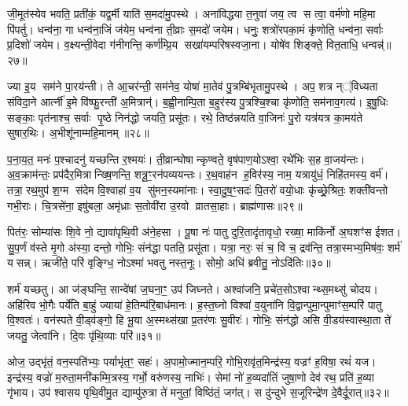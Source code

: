{\anuvakamend[{अ॒गा॒ स॒ह॒स्रा॒क्ष॒ दे॒वा॒स्स॒हस्र॑धारा॒मत्यꣳ॑हा॒ अनु॑वर्त्मानः॒ षोड॑श च॥५॥}]}

जी॒मूत॑स्येव भवति॒ प्रती॑कं॒ यद्व॒र्मी याति॑ स॒मदा॑मु॒पस्थे। अना॑विद्धया त॒नुवा॑ जय॒ त्व स त्वा॒ वर्म॑णो महि॒मा पि॑पर्तु। धन्व॑ना॒ गा धन्व॑ना॒जिं ज॑येम॒ धन्व॑ना ती॒व्राः स॒मदो॑ जयेम। धनुः॒ शत्रो॑रपका॒मं कृ॑णोति॒ धन्व॑ना॒ सर्वाः प्र॒दिशो॑ जयेम। व॒क्ष्यन्ती॒वेदा ग॑नीगन्ति॒ कर्ण॑म्प्रि॒य सखा॑यम्परिषस्वजा॒ना। योषे॑व शिङ्क्ते॒ वित॒ताधि॒ धन्वन्न्॑॥२७॥

ज्या इ॒य सम॑ने पा॒रय॑न्ती। ते आ॒चर॑न्ती॒ सम॑नेव॒ योषा॑ मा॒तेव॑ पु॒त्रम्बि॑भृतामु॒पस्थे। अप॒ शत्र न््॑विध्यता संविदा॒ने आर्त्नी॑ इ॒मे वि॑ष्फु॒रन्ती॑ अ॒मित्रान्॑। ब॒ह्वी॒नाम्पि॒ता ब॒हुर॑स्य पु॒त्रश्चि॒श्चा कृ॑णोति॒ सम॑नाव॒गत्य॑। इ॒षु॒धिः सङ्काः॒ पृत॑नाश्च॒ सर्वाः पृ॒ष्ठे निन॑द्धो जयति॒ प्रसू॑तः। रथे॒ तिष्ठ॑न्नयति वा॒जिनः॑ पु॒रो यत्र॑यत्र का॒मय॑ते सुषार॒थिः। अ॒भीशू॑नाम्महि॒मानम्॥२८॥

प॒ना॒य॒त॒ मनः॑ प॒श्चादनु॑ यच्छन्ति र॒श्मयः॑। ती॒व्रान्घोषान्कृण्वते॒ वृष॑पाण॒योऽश्वा॒ रथे॑भिः स॒ह वा॒जय॑न्तः। अ॒व॒क्राम॑न्तः॒ प्रप॑दैर॒मित्रान्ख्षि॒णन्ति॒ शत्रू॒ꣳ॒रन॑पव्ययन्तः। र॒थ॒वाह॑न ह॒विर॑स्य॒ नाम॒ यत्रायु॑धं॒ निहि॑तमस्य॒ वर्म॑। तत्रा॒ रथ॒मुप॑ श॒ग्म स॑देम वि॒श्वाहा॑ व॒य सु॑मन॒स्यमा॑नाः। स्वा॒दु॒ष॒ꣳ॒सदः॑ पि॒तरो॑ वयो॒धाः कृ॑च्छ्रे॒श्रितः॒ शक्ती॑वन्तो गभी॒राः। चि॒त्रसे॑ना॒ इषु॑बला॒ अमृ॑ध्राः स॒तोवी॑रा उ॒रवो व्रातसा॒हाः। ब्राह्म॑णासः॥२९॥

पित॑रः॒ सोम्या॑सः शि॒वे नो॒ द्यावा॑पृथि॒वी अ॑ने॒हसा। पू॒षा नः॑ पातु दुरि॒तादृ॑तावृधो॒ रख्षा॒ माकि॑र्नो अ॒घशꣳ॑स ईशत। सु॒प॒र्णं व॑स्ते मृ॒गो अ॑स्या॒ दन्तो॒ गोभिः॒ संन॑द्धा पतति॒ प्रसू॑ता। यत्रा॒ नरः॒ सं च॒ वि च॒ द्रव॑न्ति॒ तत्रा॒स्मभ्य॒मिष॑वः॒ शर्म॑ यसन्न्। ऋजी॑ते॒ परि॑ वृङ्ग्धि॒ नोऽश्मा॑ भवतु नस्त॒नूः। सोमो॒ अधि॑ ब्रवीतु॒ नोऽदि॑तिः॥३०॥

शर्म॑ यच्छतु। आ ज॑ङ्घन्ति॒ सान्वे॑षां ज॒घना॒ꣳ॒ उप॑ जिघ्नते। अश्वा॑जनि॒ प्रचे॑त॒सोऽश्वान्थ्स॒मथ्सु॑ चोदय। अहि॑रिव भो॒गैः पर्ये॑ति बा॒हुं ज्याया॑ हे॒तिम्प॑रि॒बाध॑मानः। ह॒स्त॒घ्नो विश्वा॑ व॒युना॑नि वि॒द्वान्पुमा॒न्पुमाꣳ॑स॒म्परि॑ पातु वि॒श्वतः॑। वन॑स्पते वी॒ड्व॑ङ्गो॒ हि भू॒या अ॒स्मथ्स॑खा प्र॒तर॑णः सु॒वीरः॑। गोभिः॒ संन॑द्धो असि वी॒डय॑स्वास्था॒ता ते॑ जयतु॒ जेत्वा॑नि। दि॒वः पृ॑थि॒व्याः परि॑॥३१॥

ओज॒ उद्भृ॑तं॒ वन॒स्पति॑भ्यः॒ पर्याभृ॑त॒ꣳ॒ सहः॑। अ॒पामो॒ज्मान॒म्परि॒ गोभि॒रावृ॑त॒मिन्द्र॑स्य॒ वज्रꣳ॑ ह॒विषा॒ रथं॑ यज। इन्द्र॑स्य॒ वज्रो॑ म॒रुता॒मनी॑कम्मि॒त्रस्य॒ गर्भो॒ वरु॑णस्य॒ नाभिः॑। सेमां नो॑ ह॒व्यदा॑तिं जुषा॒णो देव॑ रथ॒ प्रति॑ ह॒व्या गृ॑भाय। उप॑ श्वासय पृथि॒वीमु॒त द्याम्पु॑रु॒त्रा ते॑ मनुतां॒ विष्ठि॑तं॒ जग॑त्। स दु॑न्दुभे स॒जूरिन्द्रे॑ण दे॒वैर्दू॒रात्॥३२॥

